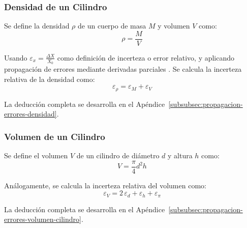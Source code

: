 
\subsubsection{Densidad de un Cilindro}

Se define la densidad $\rho$ de un cuerpo de masa $M$ y volumen $V$ como:
\begin{equation}
    \rho = \frac{M}{V}
    \label{eq:densidad}
\end{equation}

Usando $\varepsilon_x = \frac{\Delta X}{X_0}$ como definición de incerteza o error relativo, y aplicando propagación de errores mediante derivadas parciales \cite{baird1991experimentacion}.
Se calcula la incerteza relativa de la densidad como:
\begin{equation}
    \varepsilon_\rho = \varepsilon_M + \varepsilon_V
    \label{eq:incerteza-relativa-densidad}
\end{equation}

La deducción completa se desarrolla en el Apéndice~\ref{subsubsec:propagacion-errores-densidad}.


\subsubsection{Volumen de un Cilindro}

Se define el volumen $V$ de un cilindro de diámetro $d$ y altura $h$ como:
\begin{equation}
    V = \frac{\pi}{4} d^2 h
    \label{eq:volumen-cilindro}
\end{equation}

Análogamente, se calcula la incerteza relativa del volumen como:
\begin{equation}
    \varepsilon_V = 2\,\varepsilon_d + \varepsilon_h + \varepsilon_\pi
    \label{eq:incerteza-relativa-volumen-cilindro}
\end{equation}

La deducción completa se desarrolla en el Apéndice~\ref{subsubsec:propagacion-errores-volumen-cilindro}.


